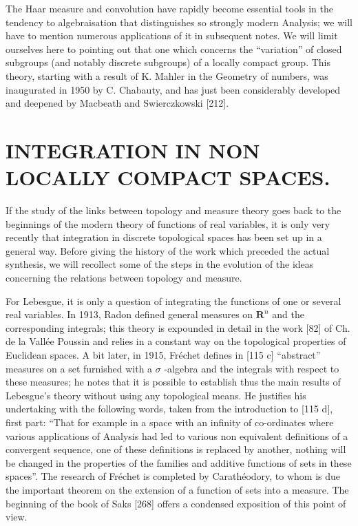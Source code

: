 The Haar measure and convolution have rapidly become essential tools in the tendency to algebraisation that distinguishes so strongly modern Analysis; we will have to mention numerous applications of it in subsequent notes. We will limit ourselves here to pointing out that one which concerns the ``variation'' of closed subgroups (and notably discrete subgroups) of a locally compact group. This theory, starting with a result of K. Mahler in the Geometry of numbers, was inaugurated in 1950 by C. Chabauty, and has just been considerably developed and deepened by Macbeath and Swierczkowski {[}212{]}.

\chapter{INTEGRATION IN NON LOCALLY COMPACT SPACES.}

If the study of the links between topology and measure theory goes back to the beginnings of the modern theory of functions of real variables, it is only very recently that integration in discrete topological spaces has been set up in a general way. Before giving the history of the work which preceded the actual synthesis, we will recollect some of the steps in the evolution of the ideas concerning the relations between topology and measure.

For Lebesgue, it is only a question of integrating the functions of one or several real variables. In 1913, Radon defined general measures on \(\mathbf{R}^n\) and the corresponding integrals; this theory is expounded in detail in the work {[}82{]} of Ch. de la Vallée Poussin and relies in a constant way on the topological properties of Euclidean spaces. A bit later, in 1915, Fréchet defines in {[}115 c{]} ``abstract'' measures on a set furnished with a \(\sigma\) -algebra and the integrals with respect to these measures; he notes that it is possible to establish thus the main results of Lebesgue's theory without using any topological means. He justifies his undertaking with the following words, taken from the introduction to {[}115 d{]}, first part: ``That for example in a space with an infinity of co-ordinates where various applications of Analysis had led to various non equivalent definitions of a convergent sequence, one of these definitions is replaced by another, nothing will be changed in the properties of the families and additive functions of sets in these spaces''. The research of Fréchet is completed by Carathéodory, to whom is due the important theorem on the extension of a function of sets into a measure. The beginning of the book of Saks {[}268{]} offers a condensed exposition of this point of view.

